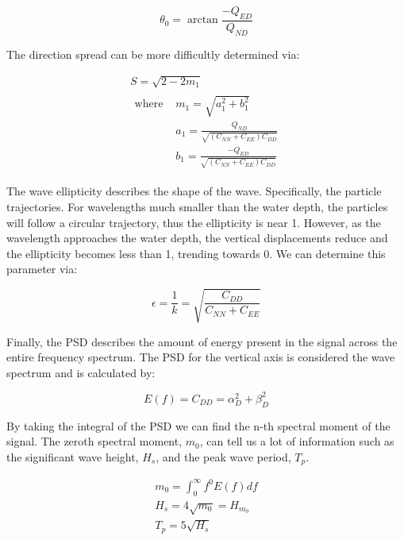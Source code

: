 \begin{equation}
    \theta_0 = \arctan{\frac{-Q_{ED}}{Q_{ND}}}
\end{equation}

The direction spread can be more difficultly determined via:

\begin{gather}
    S = \sqrt{2-2m_1} \\
    \begin{aligned}
        \text{where }   &m_1 = \sqrt{a_1^2 + b_1^2} \\
                        &a_1 = \frac{Q_{ND}}{\sqrt{(C_{NN}+C_{EE})C_{DD}}} \\
                        &b_1 = \frac{-Q_{ED}}{\sqrt{(C_{NN}+C_{EE})C_{DD}}}
    \end{aligned}
\end{gather}

The wave ellipticity describes the shape of the wave. 
Specifically, the particle trajectories. 
For wavelengths much smaller than the water depth, the particles will follow a circular trajectory, thus the ellipticity is near 1. 
However, as the wavelength approaches the water depth, the vertical displacements reduce and the ellipticity becomes less than 1, trending towards 0. 
We can determine this parameter via:

\begin{equation}
    \epsilon = \frac{1}{k} = \sqrt{\frac{C_{DD}}{C_{NN}+C_{EE}}}
\end{equation}

Finally, the PSD describes the amount of energy present in the signal across the entire frequency spectrum. 
The PSD for the vertical axis is considered the wave spectrum and is calculated by:

\begin{equation}
    E(f) = C_{DD} = \alpha^2_D + \beta^2_D
\end{equation}

By taking the integral of the PSD we can find the n-th spectral moment of the signal. 
The zeroth spectral moment, $m_0$, can tell us a lot of information such as the significant wave height, $H_s$, and the peak wave period, $T_p$.

\begin{gather}
    m_0 = \int^\infty_0 f^0E(f)df \\
    H_s = 4\sqrt{m_0} = H_{m_0} \\
    T_p = 5 \sqrt{H_s}
\end{gather}

